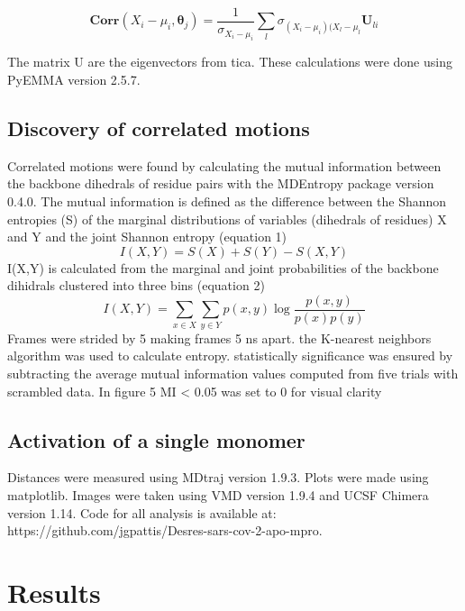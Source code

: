 \documentclass{biophys-new}
\begin{document}
\begin{equation}
\mathbf{Corr}(X_i - \mu_i, \mathbf{\theta}_j) = \frac{1}{\sigma_{X_i - \mu_i}}\sum_l \sigma_{(X_i - \mu_i)(X_l - \mu_l} \mathbf{U}_{li}    
\end{equation}

The matrix U are the eigenvectors from tica. These calculations were done using PyEMMA version 2.5.7. \cite{scherer2015pyemma}

\subsection*{Discovery of correlated motions}

Correlated motions were found by calculating the mutual information between the backbone dihedrals of residue pairs with the MDEntropy package version 0.4.0.\cite{mdentropy} The mutual information is defined as the difference between the Shannon entropies (S) of the marginal distributions of variables (dihedrals of residues) X and Y and the joint Shannon entropy (equation 1)
\begin{equation}
I(X, Y)=S(X)+S(Y)-S(X, Y)
\end{equation}
I(X,Y) is calculated from the marginal and joint probabilities of the backbone dihidrals clustered into three bins (equation 2)
\begin{equation}
I(X, Y)=\sum_{x \in X} \sum_{y \in Y} p(x, y) \log \frac{p(x, y)}{p(x) p(y)}
\end{equation}
Frames were strided by 5 making frames 5 ns apart. the K-nearest neighbors algorithm was used to calculate entropy. statistically significance was ensured by subtracting the average mutual information values computed from five trials with scrambled data. In figure 5 MI < 0.05 was set to 0 for visual clarity

\subsection*{Activation of a single monomer}

Distances were measured using MDtraj version 1.9.3.\cite{McGibbon2015MDTraj} Plots were made using matplotlib.\cite{Hunter:2007} Images were taken using VMD version 1.9.4\cite{HUMP96} and UCSF Chimera version 1.14.\cite{pettersen2004ucsf} Code for all analysis is available at: https://github.com/jgpattis/Desres-sars-cov-2-apo-mpro.

\section*{Results}
\end{document}
